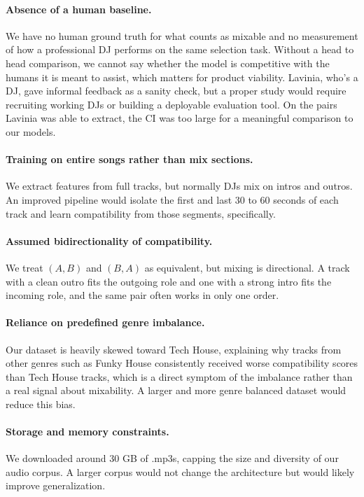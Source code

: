 \documentclass{article}
\begin{document}
\paragraph*{Absence of a human baseline.} We have no human ground truth for what counts as mixable and no measurement of how a professional DJ performs on the same selection task. Without a head to head comparison, we cannot say whether the model is competitive with the humans it is meant to assist, which matters for product viability. Lavinia, who's a DJ, gave informal feedback as a sanity check, but a proper study would require recruiting working DJs or building a deployable evaluation tool. On the pairs Lavinia was able to extract, the CI was too large for a meaningful comparison to our models.

\paragraph*{Training on entire songs rather than mix sections.} 
We extract features from full tracks, but normally DJs mix on intros and outros. An improved pipeline would isolate the first and last 30 to 60 seconds of each track and learn compatibility from those segments, specifically. 

\paragraph*{Assumed bidirectionality of compatibility.} We treat $(A, B)$ and $(B, A)$ as equivalent, but mixing is directional. A track with a clean outro fits the outgoing role and one with a strong intro fits the incoming role, and the same pair often works in only one order. 

\paragraph*{Reliance on predefined genre imbalance.} Our dataset is heavily skewed toward Tech House, explaining why tracks from other genres such as Funky House consistently received worse compatibility scores than Tech House tracks, which is a direct symptom of the imbalance rather than a real signal about mixability. A larger and more genre balanced dataset would reduce this bias.

\paragraph*{Storage and memory constraints.} We downloaded around 30 GB of .mp3s, capping the size and diversity of our audio corpus. A larger corpus would not change the architecture but would likely improve generalization.
\end{document}
